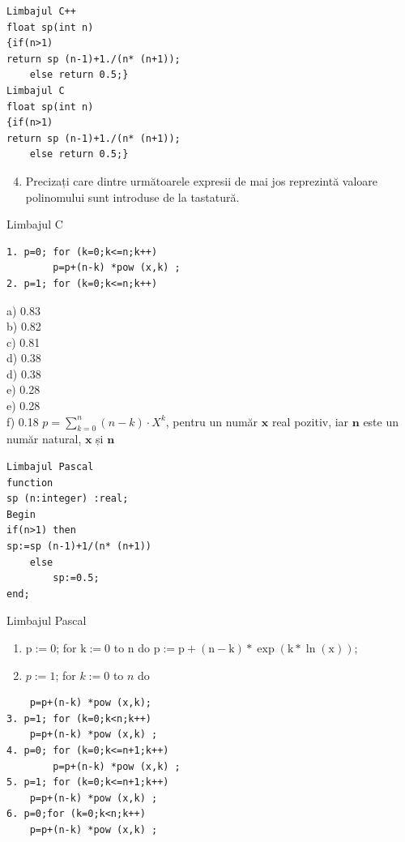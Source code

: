 \documentclass[10pt]{article}
\begin{document}
\begin{verbatim}
Limbajul C++
float sp(int n)
{if(n>1)
return sp (n-1)+1./(n* (n+1));
    else return 0.5;}
Limbajul C
float sp(int n)
{if(n>1)
return sp (n-1)+1./(n* (n+1));
    else return 0.5;}
\end{verbatim}

\begin{enumerate}
  \setcounter{enumi}{3}
  \item Precizați care dintre următoarele expresii de mai jos reprezintă valoare polinomului sunt introduse de la tastatură.
\end{enumerate}

Limbajul C

\begin{verbatim}
1. p=0; for (k=0;k<=n;k++)
        p=p+(n-k) *pow (x,k) ;
2. p=1; for (k=0;k<=n;k++)
\end{verbatim}

a) 0.83\\
b) 0.82\\
c) 0.81\\
d) 0.38\\
d) 0.38\\
e) 0.28\\
e) 0.28\\
f) 0.18 $p=\sum_{k=0}^{n}(n-k) \cdot X^{k}$, pentru un număr $\mathbf{x}$ real pozitiv, iar $\mathbf{n}$ este un număr natural, $\mathbf{x}$ și $\mathbf{n}$

\begin{verbatim}
Limbajul Pascal
function
sp (n:integer) :real;
Begin
if(n>1) then
sp:=sp (n-1)+1/(n* (n+1))
    else
        sp:=0.5;
end;
\end{verbatim}

Limbajul Pascal

\begin{enumerate}
  \item $\mathrm{p}:=0$; for $\mathrm{k}:=0$ to n do $\mathrm{p}:=\mathrm{p}+(\mathrm{n}-\mathrm{k}) * \exp (\mathrm{k} * \ln (\mathrm{x}))$;
  \item $p:=1$; for $k:=0$ to $n$ do
\end{enumerate}

\begin{verbatim}
    p=p+(n-k) *pow (x,k);
3. p=1; for (k=0;k<n;k++)
    p=p+(n-k) *pow (x,k) ;
4. p=0; for (k=0;k<=n+1;k++)
        p=p+(n-k) *pow (x,k) ;
5. p=1; for (k=0;k<=n+1;k++)
    p=p+(n-k) *pow (x,k) ;
6. p=0;for (k=0;k<n;k++)
    p=p+(n-k) *pow (x,k) ;
\end{verbatim}
\end{document}

